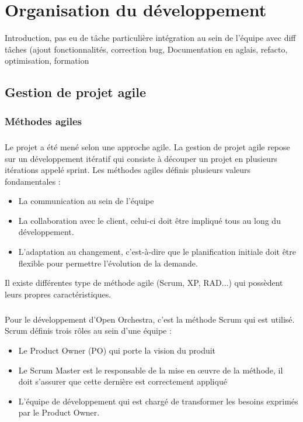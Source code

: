 \chapter{Organisation du développement}
Introduction, pas eu de tâche particulière intégration au sein de l'équipe avec diff tâches (ajout fonctionnalités, correction bug, Documentation en aglais, refacto, optimisation, formation

\section{Gestion de projet agile}
\subsection{Méthodes agiles}
\paragraph{}
Le projet a été mené selon une approche agile. La gestion de projet agile repose sur un développement itératif qui consiste à découper un projet en plusieurs itérations appelé sprint. Les méthodes agiles définis plusieurs valeurs fondamentales : 
\begin{itemize}
\item La communication au sein de l'équipe
\item La collaboration avec le client, celui-ci doit être impliqué tous au long du développement.
\item L'adaptation au changement, c'est-à-dire que le planification initiale doit être flexible pour permettre l'évolution de la demande. 
\end{itemize}
Il existe différentes type de méthode agile (Scrum, XP, RAD...) qui possèdent leurs propres caractéristiques.
\paragraph{}
Pour le développement d'Open Orchestra, c'est la méthode Scrum qui est utilisé. Scrum définis trois rôles au sein d'une équipe : 
\begin{itemize}
\item  Le \og Product Owner (PO) \fg{} qui porte la vision du produit
\item Le \og Scrum Master \fg{} est le responsable de la mise en œuvre de la méthode, il doit s'assurer que cette dernière est correctement appliqué
\item L'équipe de développement qui est chargé de transformer les besoins exprimés par le Product Owner. 
\end{itemize}
